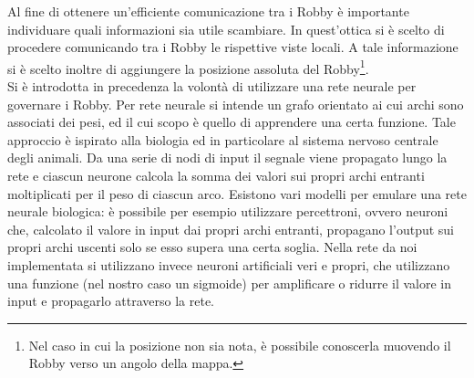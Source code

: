 Al fine di ottenere un'efficiente comunicazione tra i Robby è importante
individuare quali informazioni sia utile scambiare. In quest'ottica si è scelto
di procedere comunicando tra i Robby le rispettive viste locali. A tale
informazione si è scelto inoltre di aggiungere la posizione assoluta del
Robby\footnote{Nel caso in cui la posizione non sia nota, è possibile conoscerla
muovendo il Robby verso un angolo della mappa.}.\\



Si è introdotta in precedenza la volontà di utilizzare una rete neurale per
governare i Robby. Per rete neurale si intende un grafo orientato ai cui archi 
sono associati dei pesi, ed il cui scopo è quello di apprendere una certa 
funzione. Tale approccio è ispirato alla biologia ed in particolare al sistema 
nervoso centrale degli animali. Da una serie di nodi di input il segnale viene 
propagato lungo la rete e ciascun neurone calcola la somma dei valori sui 
propri archi entranti moltiplicati per il peso di ciascun arco. Esistono vari 
modelli per emulare una rete neurale biologica: è possibile per esempio 
utilizzare percettroni, ovvero neuroni che, calcolato il valore in input dai 
propri archi entranti, propagano l'output sui propri archi uscenti solo se esso 
supera una certa soglia. Nella rete da noi implementata si utilizzano invece 
neuroni artificiali veri e propri, che utilizzano una funzione (nel nostro caso 
un sigmoide) per amplificare o ridurre il valore in input e propagarlo 
attraverso la rete.
\\



